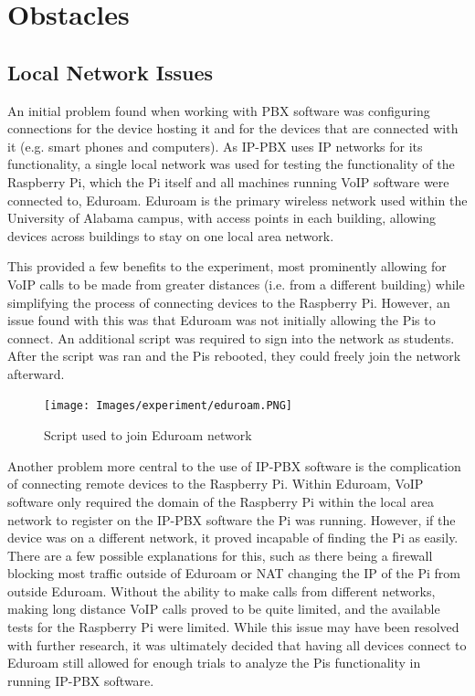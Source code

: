 \section{Obstacles}

    \subsection{Local Network Issues}
        An initial problem found when working with PBX software was configuring connections for the device hosting it and for the devices that are connected with it (e.g. smart phones and computers). As IP-PBX uses IP networks for its functionality, a single local network was used for testing the functionality of the Raspberry Pi, which the Pi itself and all machines running VoIP software were connected to, Eduroam. Eduroam is the primary wireless network used within the University of Alabama campus, with access points in each building, allowing devices across buildings to stay on one local area network. 
        
        This provided a few benefits to the experiment, most prominently allowing for VoIP calls to be made from greater distances (i.e. from a different building) while simplifying the process of connecting devices to the Raspberry Pi. However, an issue found with this was that Eduroam was not initially allowing the Pis to connect. An additional script was required to sign into the network as students. After the script was ran and the Pis rebooted, they could freely join the network afterward.
        
        \begin{figure}[htbp]
			\centerline{\texttt{[image: Images/experiment/eduroam.PNG]}}
			\caption{Script used to join Eduroam network}
			\label{fig:edu-script}
		\end{figure}
		
		Another problem more central to the use of IP-PBX software is the complication of connecting remote devices to the Raspberry Pi. Within Eduroam, VoIP software only required the domain of the Raspberry Pi within the local area network to register on the IP-PBX software the Pi was running. However, if the device was on a different network, it proved incapable of finding the Pi as easily. There are a few possible explanations for this, such as there being a firewall blocking most traffic outside of Eduroam or NAT changing the IP of the Pi from outside Eduroam. Without the ability to make calls from different networks, making long distance VoIP calls proved to be quite limited, and the available tests for the Raspberry Pi were limited. While this issue may have been resolved with further research, it was ultimately decided that having all devices connect to Eduroam still allowed for enough trials to analyze the Pis functionality in running IP-PBX software.
		
